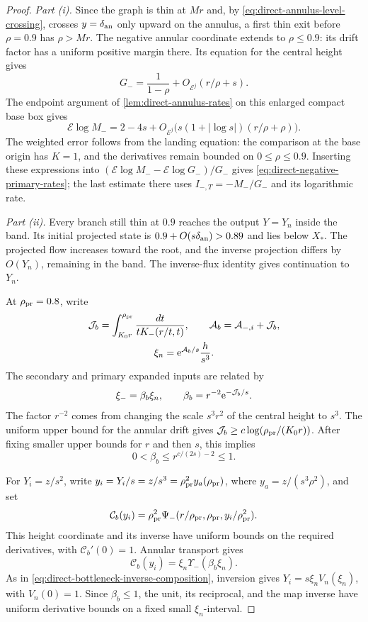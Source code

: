 \begin{proof}
\emph{Part (i).} Since the graph is thin at \(Mr\) and, by
\eqref{eq:direct-annulus-level-crossing}, crosses \(y=\delta_{\rm an}\) only
upward on the annulus, a first thin exit before \(\rho=0.9\) has \(\rho>Mr\).
The negative annular coordinate extends to \(\rho\le0.9\):
its drift factor has a uniform positive margin there.
Its equation for the central height gives
\[
 G_-=\frac1{1-\rho}+O_{\mathcal E^j}(r/\rho+s).
\]
The endpoint argument of
\cref{lem:direct-annulus-rates} on this enlarged compact
base box gives
\[
 \mathcal E\log M_-=2-4s+
        O_{\mathcal E^j}\bigl(s(1+|\log s|)(r/\rho+\rho)\bigr).
\]
The weighted error follows from the landing equation:
the comparison at the base origin has \(K=1\), and
the derivatives remain bounded on \(0\le\rho\le0.9\).
Inserting these expressions into
\((\mathcal E\log M_--\mathcal E\log G_-)/G_-\) gives
\eqref{eq:direct-negative-primary-rates}; the last estimate there uses
\(I_{-,T}=-M_-/G_-\) and its logarithmic rate.

\emph{Part (ii).} Every branch still thin at \(0.9\) reaches the output
\(Y=Y_n\) inside the band. Its initial projected state is
\(0.9+O(s\delta_{\rm an})>0.89\) and lies below \(X_*\).
The projected flow increases toward the root, and the inverse
projection differs by \(O(Y_n)\), remaining in the band.
The inverse-flux identity gives continuation to \(Y_n\).

At \(\rho_{\rm pr}=0.8\), write
\[
 \begin{gathered}
 \mathcal J_b=\int_{K_0r}^{\rho_{\rm pr}}\frac{dt}{tK_-(r/t,t)},
 \qquad
 \mathcal A_b=\mathcal A_{-,i}+\mathcal J_b,\\
 \xi_n=\mathrm e^{\mathcal A_b/s}\frac{h}{s^3}.
 \end{gathered}
\]
The secondary and primary expanded inputs are related by
\[
 \xi_-=\beta_b\xi_n,\qquad
 \beta_b=r^{-2}\mathrm e^{-\mathcal J_b/s}.
\]
The factor \(r^{-2}\) comes from changing the scale
\(s^3r^2\) of the central height to \(s^3\). The uniform upper bound
for the annular drift gives
\(\mathcal J_b\ge c\log(\rho_{\rm pr}/(K_0r))\). After fixing smaller
upper bounds for \(r\) and then \(s\), this implies
\[
 0<\beta_b\le r^{c/(2s)-2}\le1.
\]

For \(Y_i=z/s^2\), write
\(y_i=Y_i/s=z/s^3=\rho_{\rm pr}^2y_a(\rho_{\rm pr})\), where
\(y_a=z/(s^3\rho^2)\), and set
\[
 \mathcal C_b(y_i)
   =\rho_{\rm pr}^2\Psi_-(r/\rho_{\rm pr},\rho_{\rm pr},
                         y_i/\rho_{\rm pr}^2).
\]
This height coordinate and its inverse have uniform bounds
on the required derivatives, with \(\mathcal C_b'(0)=1\).
Annular transport gives
\[
 \mathcal C_b(y_i)
     =\xi_n\Upsilon_-(\beta_b\xi_n).
\]
As in \eqref{eq:direct-bottleneck-inverse-composition}, inversion
gives \(Y_i=s\xi_nV_n(\xi_n)\), with \(V_n(0)=1\). Since
\(\beta_b\le1\), the unit, its reciprocal, and the map inverse have
uniform derivative bounds on a fixed small \(\xi_n\)-interval.


\end{proof}
